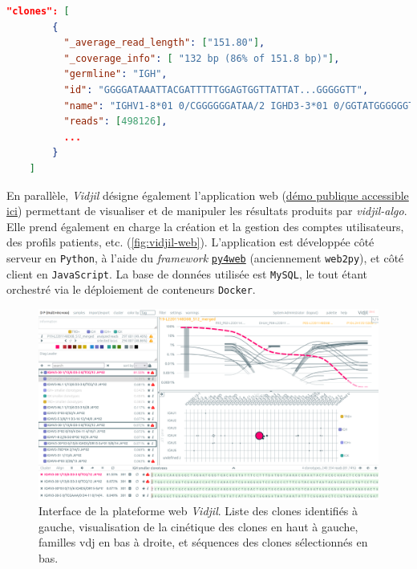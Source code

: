 \begin{lstlisting}[language=json, 
    caption={Extrait d'une sortie de \textit{vidjil-algo}.},
    label={lst:json-vidjil}]
    "clones": [
        {
          "_average_read_length": ["151.80"],
          "_coverage_info": [ "132 bp (86% of 151.8 bp)"],
          "germline": "IGH",
          "id": "GGGGATAAATTACGATTTTTGGAGTGGTTATTAT...GGGGGTT",
          "name": "IGHV1-8*01 0/CGGGGGGATAA/2 IGHD3-3*01 0/GGTATGGGGGGTTTTAG/7 IGHJ4*02",
          "reads": [498126],
          ...
        }
    ]
\end{lstlisting}

\vspace{1em}

En parallèle, \textit{Vidjil} désigne également l'application web (\href{https://app.vidjil.org/}{démo publique accessible ici}) 
permettant de visualiser et de manipuler les résultats produits par \textit{vidjil-algo}. 
Elle prend également en charge la création et la gestion des comptes utilisateurs, des profils patients, etc. (\autoref{fig:vidjil-web}). 
L'application est développée côté serveur en \texttt{Python}, à l'aide du \textit{framework} \href{https://py4web.com}{\texttt{py4web}} 
(anciennement \texttt{web2py}), et côté client en \texttt{JavaScript}. La base de données utilisée est \texttt{MySQL}, 
le tout étant orchestré via le déploiement de conteneurs \texttt{Docker}.

\begin{figure}[H]
    \centering
    \includegraphics[width=1\textwidth]{images/vidjil-web.png}
    \caption{Interface de la plateforme web \textit{Vidjil}. 
    Liste des clones identifiés à gauche, visualisation de la cinétique des clones en haut à gauche, 
    familles \gls{vdj} en bas à droite, et séquences des clones sélectionnés en bas.}
    \label{fig:vidjil-web}
\end{figure}

